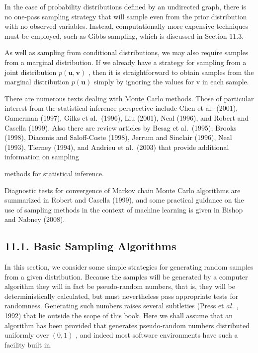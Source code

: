 \documentclass[
  10
]{article}
\begin{document}
In the case of probability distributions defined by an undirected graph,
there is no one-pass sampling strategy that will sample even from the
prior distribution with no observed variables. Instead, computationally
more expensive techniques must be employed, such as Gibbs sampling,
which is discussed in Section 11.3.

As well as sampling from conditional distributions, we may also require
samples from a marginal distribution. If we already have a strategy for
sampling from a joint distribution
\(p ( \mathbf { u } , \mathbf { v } )\) , then it is straightforward to
obtain samples from the marginal distribution \(p ( \mathbf { u } )\)
simply by ignoring the values for v in each sample.

There are numerous texts dealing with Monte Carlo methods. Those of
particular interest from the statistical inference perspective include
Chen et al.~(2001), Gamerman (1997), Gilks et al.~(1996), Liu (2001),
Neal (1996), and Robert and Casella (1999). Also there are review
articles by Besag et al.~(1995), Brooks (1998), Diaconis and
Saloff-Coste (1998), Jerrum and Sinclair (1996), Neal (1993), Tierney
(1994), and Andrieu et al.~(2003) that provide additional information on
sampling

methods for statistical inference.

Diagnostic tests for convergence of Markov chain Monte Carlo algorithms
are summarized in Robert and Casella (1999), and some practical guidance
on the use of sampling methods in the context of machine learning is
given in Bishop and Nabney (2008).

\subsection{11.1. Basic Sampling
Algorithms}\label{basic-sampling-algorithms}

In this section, we consider some simple strategies for generating
random samples from a given distribution. Because the samples will be
generated by a computer algorithm they will in fact be pseudo-random
numbers, that is, they will be deterministically calculated, but must
nevertheless pass appropriate tests for randomness. Generating such
numbers raises several subtleties (Press et \(a l .\) , 1992) that lie
outside the scope of this book. Here we shall assume that an algorithm
has been provided that generates pseudo-random numbers distributed
uniformly over \(( 0 , 1 )\) , and indeed most software environments
have such a facility built in.
\end{document}
